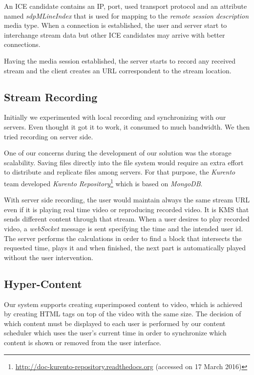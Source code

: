 \documentclass[10pt,conference]{IEEEtran}
\begin{document}
An \gls{ICE} candidate contains an \gls{IP}, port, used transport protocol and an attribute named \emph{sdpMLineIndex} that is used for mapping to the \emph{remote session description} media type.
When a connection is established, the user and server start to interchange stream data but other \gls{ICE} candidates may arrive with better connections.

Having the media session established, the server starts to record any received stream and the client creates an \gls{URL} correspondent to the stream location.

\subsection{Stream Recording}
 Initially we experimented with local recording and synchronizing with our servers. Even thought it got it to work, it consumed to much bandwidth. We then tried recording on server side.

	One of our concerns during the development of our solution was the storage scalability. Saving files directly into the file system would require an extra effort to distribute and replicate files among servers. For that purpose, the \emph{Kurento} team developed \emph{Kurento Repository}\footnote{\url{http://doc-kurento-repository.readthedocs.org} (accessed on 17 March 2016)} which is based on \emph{MongoDB}.


	With server side recording, the user would maintain always the same stream \gls{URL} even if it is playing real time video or reproducing recorded video. It is \gls{KMS} that sends different content through that stream. When a user desires to play recorded video, a \emph{webSocket} message is sent specifying the time and the intended user id. The server performs the calculations in order to find a block that intersects the requested time, plays it and when finished, the next part is automatically played without the user intervention.



\subsection{Hyper-Content}

	Our system supports creating superimposed content to video, which is achieved by creating \gls{HTML} tags on top of the video  with the same size. The decision of which content must be displayed to each user is performed by our content scheduler which uses the user's current time in order to synchronize which content is shown or removed from the user interface.
\end{document}
